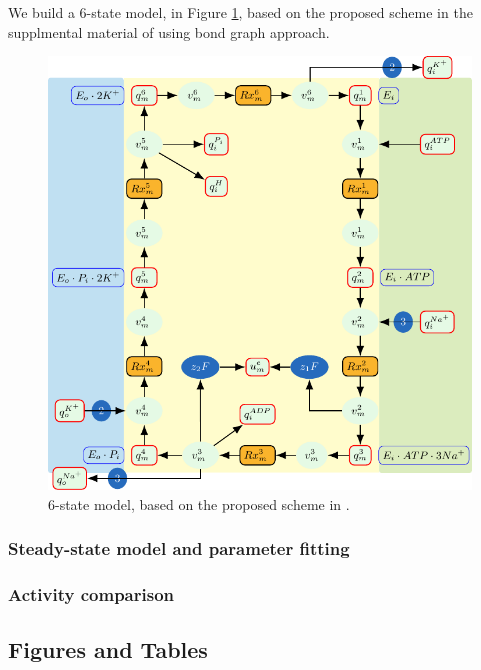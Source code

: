 \documentclass{biophys-new}
\begin{document}


We build a 6-state model, in Figure \ref{fig:6state_v2}, based on the proposed scheme in the supplmental material of \cite{nguyen_structural_2022} using bond graph approach.
\begin{figure}
\caption{6-state model, based on the proposed scheme in \cite{nguyen_structural_2022}.}
\label{fig:6state_v2}
\centering
\includegraphics[width=0.7\linewidth]{6state_2.pdf}
\end{figure}




\subsubsection{Steady-state model and parameter fitting}

\subsubsection{Activity comparison }

\subsection*{Figures and Tables}
\end{document}
